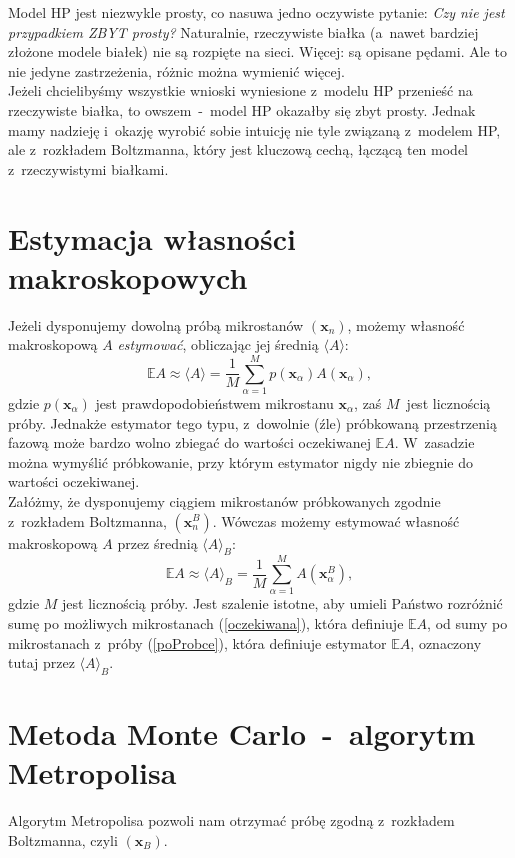 \documentclass[a4paper,11pt,twoside]{book}
\begin{document}
Model HP jest niezwykle prosty, co nasuwa jedno oczywiste pytanie: \emph{Czy nie jest przypadkiem ZBYT prosty?} Naturalnie, rzeczywiste białka (a~nawet bardziej złożone modele białek) nie są rozpięte na sieci. Więcej: są opisane pędami. Ale to nie jedyne zastrzeżenia, różnic można wymienić więcej.\\
 
Jeżeli chcielibyśmy wszystkie wnioski wyniesione z~modelu HP przenieść na rzeczywiste białka, to owszem~-~model HP okazałby się zbyt prosty. Jednak mamy nadzieję i~okazję wyrobić sobie intuicję nie tyle związaną z~modelem HP, ale z~rozkładem Boltzmanna, który jest kluczową cechą, łączącą ten model z~rzeczywistymi białkami. 
\section{Estymacja własności makroskopowych}
Jeżeli dysponujemy dowolną próbą mikrostanów $(\mathbf{x}_n )$, możemy własność makroskopową $A$ \emph{estymować}, obliczając jej średnią $\langle A \rangle$:
\begin{displaymath}
\mathbb{E} A \approx \langle A \rangle = \frac{1}{M}\sum_{\alpha=1}^M p(\mathbf{x}_{\alpha}) A(\mathbf{x}_{\alpha}),
\end{displaymath}
gdzie $p(\mathbf{x}_{\alpha} )$ jest prawdopodobieństwem mikrostanu $\mathbf{x}_{\alpha}$, zaś $M$~jest licznością próby. Jednakże estymator tego
typu, z~dowolnie (źle) próbkowaną przestrzenią fazową może bardzo wolno zbiegać
do wartości oczekiwanej $\mathbb{E} A$. W~zasadzie można wymyślić próbkowanie,
przy którym estymator nigdy nie zbiegnie do wartości oczekiwanej.\\

Załóżmy, że dysponujemy ciągiem mikrostanów próbkowanych zgodnie z~rozkładem Boltzmanna, $(\mathbf{x}^B_n )$. Wówczas możemy estymować własność makroskopową $A$ przez średnią $\langle A \rangle_B$:
\begin{equation}
\mathbb{E} A \approx \langle A \rangle_B = \frac{1}{M} \sum_{\alpha=1}^M A(\mathbf{x}^B_{\alpha} ), \label{poProbce}
\end{equation}
gdzie $M$ jest licznością próby. Jest szalenie istotne, aby umieli Państwo rozróżnić sumę po możliwych mikrostanach (\ref{oczekiwana}), która definiuje $\mathbb{E} A$, od sumy po mikrostanach z~próby (\ref{poProbce}), która definiuje estymator $\mathbb{E} A$, oznaczony tutaj przez $\langle A \rangle_B$.
\section{Metoda Monte Carlo~-~algorytm Metropolisa}
Algorytm Metropolisa pozwoli nam otrzymać próbę zgodną z~rozkładem Boltzmanna, czyli $(\mathbf{x}_B)$. \\
\end{document}

